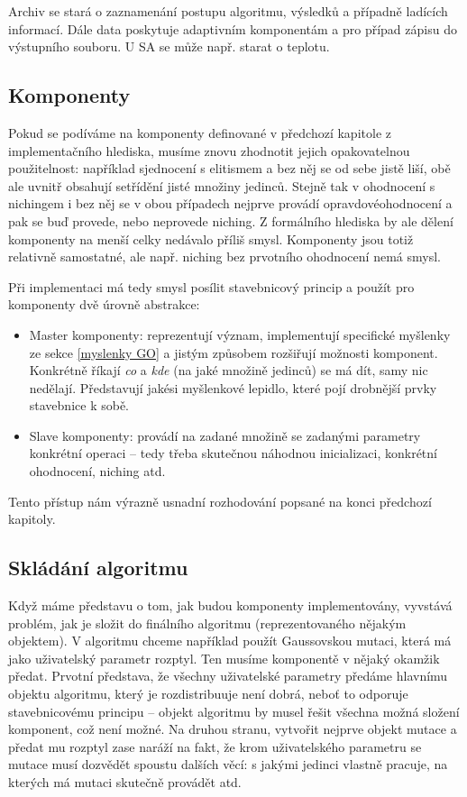 Archiv se stará o zaznamenání postupu algoritmu, výsledků a případně ladících informací. Dále data poskytuje adaptivním komponentám a pro případ zápisu do výstupního souboru. U SA se může např. starat o teplotu.

\subsection{Komponenty}

Pokud se podíváme na komponenty definované v předchozí kapitole z implementačního hlediska, musíme znovu zhodnotit jejich opakovatelnou použitelnost: například sjednocení s elitismem a bez něj se od sebe jistě liší, obě ale uvnitř obsahují setřídění jisté množiny jedinců. Stejně tak v ohodnocení s nichingem i bez něj se v obou případech nejprve provádí \bq opravdové\eq   ohodnocení a pak se buď provede, nebo neprovede niching. Z formálního hlediska by ale dělení komponenty na menší celky nedávalo příliš smysl. Komponenty jsou totiž relativně samostatné, ale např. niching bez prvotního ohodnocení nemá smysl.

Při implementaci má tedy smysl posílit stavebnicový princip a použít pro komponenty dvě úrovně abstrakce:
\begin{itemize}
  \item Master komponenty: reprezentují význam, implementují specifické myšlenky ze sekce \ref{myslenky GO} a jistým způsobem rozšiřují možnosti komponent. Konkrétně říkají \emph{co} a \emph{kde} (na jaké množině jedinců) se má dít, samy nic nedělají. Představují jakési myšlenkové lepidlo, které pojí drobnější prvky stavebnice k sobě.
  \item Slave komponenty: provádí na zadané množině se zadanými parametry konkrétní operaci -- tedy třeba skutečnou náhodnou inicializaci, konkrétní ohodnocení, niching atd.
\end{itemize}
Tento přístup nám výrazně usnadní rozhodování popsané na konci předchozí kapitoly.

\subsection{Skládání algoritmu}

Když máme představu o tom, jak budou komponenty implementovány, vyvstává problém, jak je složit do finálního algoritmu (reprezentovaného nějakým objektem). V algoritmu chceme například použít Gaussovskou mutaci, která má jako uživatelský parametr rozptyl. Ten musíme komponentě v nějaký okamžik předat. Prvotní představa, že všechny uživatelské parametry předáme hlavnímu objektu algoritmu, který je rozdistribuuje není dobrá, neboť to odporuje stavebnicovému principu -- objekt algoritmu by musel řešit všechna možná složení komponent, což není možné. Na druhou stranu, vytvořit nejprve objekt mutace a předat mu rozptyl zase naráží na fakt, že krom uživatelského parametru se mutace musí dozvědět spoustu dalších věcí: s jakými jedinci vlastně pracuje, na kterých má mutaci skutečně provádět atd.

